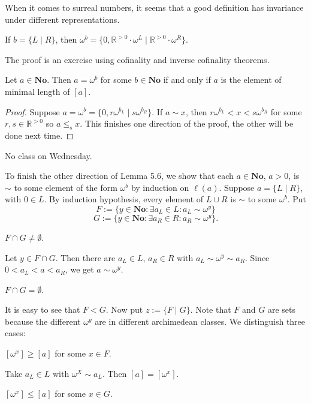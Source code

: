 When it comes to surreal numbers, it seems that a good definition has invariance under different representations.
\begin{corollary} %
If $b=\{L\mid R\}$, then $\omega^b=\{0,\mathbb{R}^{>0}\cdot \omega^L\mid \mathbb{R}^{>0}\cdot \omega^R\}$.
 \end{corollary}

The proof is an exercise using cofinality and inverse cofinality theorems.

\begin{lemma} %
Let $a\in \mathbf{No}$. Then $a=\omega^b$ for some $b\in\mathbf{No}$ if and only if $a$ is the element of minimal length of $[a]$.
 \end{lemma}

\begin{proof} %
Suppose $a=\omega^b=\{0,r\omega^{b_L}\mid s\omega^{b_R}\}$. If $a\sim x$, then $r\omega^{b_L}<x<s\omega^{b_R}$ for some $r,s\in\mathbb{R}^{>0}$ so $a\le_s x$. This finishes one direction of the proof, the other will be done next time.
 \end{proof}

No class on Wednesday. 

To finish the other direction of Lemma 5.6, we show that each $a\in\mathbf{No}$, $a>0$, is $\sim$ to some element of the form $\omega^b$ by induction on $\ell(a)$. Suppose $a=\{L\mid R\}$, with $0\in L$. By induction hypothesis, every element of $L\cup R$ is $\sim$ to some $\omega^b$. Put
$$F:=\{y\in\mathbf{No}:\exists a_L\in L:a_L\sim \omega^y\}$$
$$G:=\{y\in\mathbf{No}:\exists a_R\in R:a_R\sim \omega^y\}.$$

 $F\cap G\neq \emptyset$. 

Let $y\in F\cap G$. Then there are $a_L\in L$, $a_R\in R$ with $a_L\sim\omega^y\sim a_R$. Since $0<a_L<a<a_R$, we get $a\sim \omega^y$.

 $F\cap G=\emptyset$. 

It is easy to see that $F<G$. Now put $z:=\{F\mid G\}$. Note that $F$ and $G$ are sets because the different $\omega^y$ are in different archimedean classes. We distinguish three cases:

 $[\omega^x]\ge [a]$ for some $x\in F$.

Take $a_L\in L$ with $\omega^X\sim a_L$. Then $[a]=[\omega^x]$.

 $[\omega^x]\le [a]$ for some $x\in G$.

